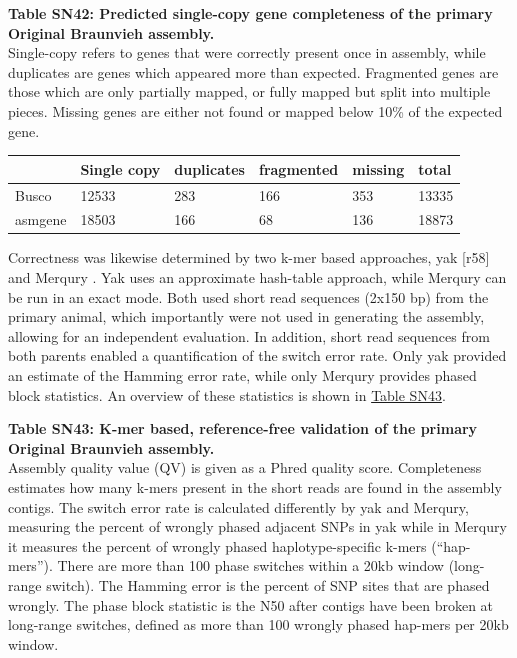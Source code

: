 \documentclass[../main.tex]{subfiles}
\begin{document}
\begin{flushleft}
\textbf{\hypertarget{Table SN42}{Table SN42}: Predicted single-copy gene completeness of the primary Original Braunvieh assembly.} \\
\footnotesize{Single-copy refers to genes that were correctly present once in assembly, while duplicates are genes which appeared more than expected. Fragmented genes are those which are only partially mapped, or fully mapped but split into multiple pieces. Missing genes are either not found or mapped below 10\% of the expected gene. }
\begin{center}
    \centering
    \begin{tabular}{|l|l|l|l|l|l|}
    \hline
    ~       & Single copy & duplicates & fragmented & missing & total  \\
    \hline
    Busco   & 12533       & 283        & 166        & 353     & 13335  \\
    \hline
    asmgene & 18503       & 166        & 68         & 136     & 18873  \\
    \hline
\end{tabular}
\end{center}

\normalsize
\bigskip

Correctness was likewise determined by two k-mer based approaches, yak [r58] \citep{cheng2021haplotype} and Merqury \citep{rhie2020merqury}. Yak uses an approximate hash-table approach, while Merqury can be run in an exact mode. Both used short read sequences (2x150 bp) from the primary animal, which importantly were not used in generating the assembly, allowing for an independent evaluation. In addition, short read sequences from both parents enabled a quantification of the switch error rate. Only yak provided an estimate of the Hamming error rate, while only Merqury provides phased block statistics. An overview of these statistics is shown in \hyperlink{Table SN43}{Table SN43}.

\bigskip

\textbf{\hypertarget{Table SN43}{Table SN43}: K-mer based, reference-free validation of the primary Original Braunvieh assembly.} \\
\footnotesize{Assembly quality value (QV) is given as a Phred quality score. Completeness estimates how many k-mers present in the short reads are found in the assembly contigs. The switch error rate is calculated differently by yak and Merqury, measuring the percent of wrongly phased adjacent SNPs in yak while in Merqury it measures the percent of wrongly phased haplotype-specific k-mers (“hap-mers”). There are more than 100 phase switches within a 20kb window (long-range switch). The Hamming error is the percent of SNP sites that are phased wrongly. The phase block statistic is the N50 after contigs have been broken at long-range switches, defined as more than 100 wrongly phased hap-mers per 20kb window.}


\end{flushleft}
\end{document}
